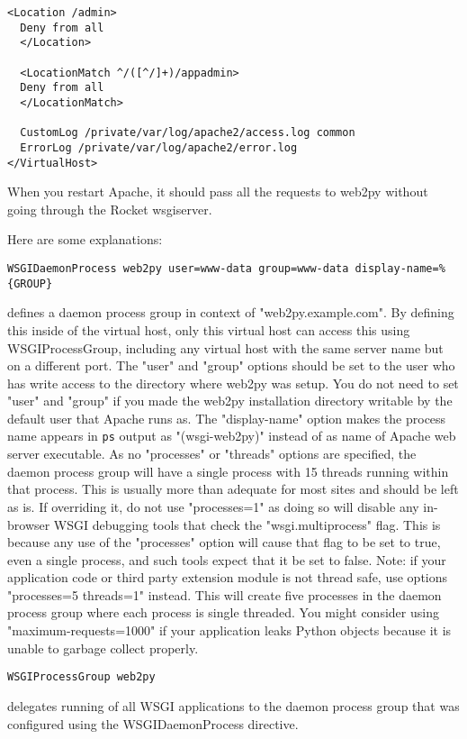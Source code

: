 \documentclass[justified,sixbynine,notoc]{tufte-book}
\def\ft{\small\tt}
\begin{document}
\begin{fullwidth}
\begin{lstlisting}[keywords={}]
  <Location /admin>
  Deny from all
  </Location>

  <LocationMatch ^/([^/]+)/appadmin>
  Deny from all
  </LocationMatch>

  CustomLog /private/var/log/apache2/access.log common
  ErrorLog /private/var/log/apache2/error.log
</VirtualHost>
\end{lstlisting}

When you restart Apache, it should pass all the requests to web2py without going through the Rocket wsgiserver.

Here are some explanations:
\begin{lstlisting}
WSGIDaemonProcess web2py user=www-data group=www-data display-name=%{GROUP}
\end{lstlisting}
\noindent defines a daemon process group in context of "web2py.example.com". By
defining this inside of the virtual host, only this virtual host can access this using WSGIProcessGroup, including any virtual host with the same server name but on a different
port. The "user" and "group"
options should be set to the user who has write access to the
directory where web2py was setup. You do not need to set "user" and
"group" if you made the web2py installation directory writable by
the default user that Apache runs as. The "display-name" option
makes the process name appears in {\ft ps} output as "(wsgi-web2py)"
instead of as name of Apache web server executable. As no "processes"
or "threads" options are specified, the daemon process group will have a
single process with 15 threads running within that process. This is
usually more than adequate for most sites and should be left as is.
If overriding it, do not use "processes=1" as doing so will disable
any in-browser WSGI debugging tools that check the "wsgi.multiprocess"
flag. This is because any use of the "processes" option will cause
that flag to be set to true, even a single process, and such tools
expect that it be set to false. Note: if your application code
or third party extension module is not
thread safe, use options "processes=5 threads=1" instead. This will
create five processes in the daemon process group where each process
is single threaded. You might consider using "maximum-requests=1000"
if your application leaks Python objects because it is unable to garbage collect properly.
\begin{lstlisting}
WSGIProcessGroup web2py
\end{lstlisting}
\noindent delegates running of all WSGI applications to the daemon process group
that was configured using the WSGIDaemonProcess directive.

\end{fullwidth}
\end{document}
